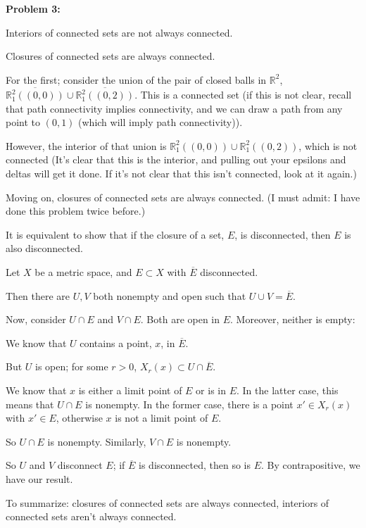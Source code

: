 \documentclass[a4paper,12pt]{article}
\newcommand{\tab}{\hspace{4mm}} %
\newcommand{\shunt}{\vspace{20mm}}
\newcommand{\R}{\mathbb{R}}
\begin{document}
\shunt

{\bf Problem 3:}

Interiors of connected sets are not always connected.

Closures of connected sets are always connected. 

For the first; consider the union of the pair of closed balls in $\R^2$, $\overline{\R^2_1((0,0))} \cup \overline{\R^2_1((0,2))}$. This is a connected set (if this is not clear, recall that path connectivity implies connectivity, and we can draw a path from any point to $(0,1)$ (which will imply path connectivity)).

However, the interior of that union is $\R^2_1((0,0)) \cup \R^2_1((0,2))$, which is not connected (It's clear that this is the interior, and pulling out your epsilons and deltas will get it done. If it's not clear that this isn't connected, look at it again.)

Moving on, closures of connected sets are always connected. (I must admit: I have done this problem twice before.)

\tab It is equivalent to show that if the closure of a set, $E$, is disconnected, then $E$ is also disconnected.

\tab Let $X$ be a metric space, and $E \subset X$ with $\overline{E}$ disconnected.

\tab  Then there are $U,V$ both nonempty and open such that $U \cup V = \overline{E}$.

\tab Now, consider $U \cap E$ and $V \cap E$. Both are open in $E$. Moreover, neither is empty:

\tab \tab We know that $U$ contains a point, $x$, in $\overline{E}$.

\tab \tab But $U$ is open; for some $r >0$, $X_r(x) \subset U \cap \overline{E}$.

\tab \tab We know that $x$ is either a limit point of $E$ or is in $E$. In the latter case, this means that $U \cap E$ is nonempty. In the former case, there is a point $x' \in X_r(x)$ with $x' \in E$, otherwise $x$ is not a limit point of $E$. 

\tab \tab So $U \cap E$ is nonempty. Similarly, $V \cap E$ is nonempty.

\tab \tab So $U$ and $V$ disconnect $E$; if $\overline{E}$ is disconnected, then so is $E$. By contrapositive, we have our result.

To summarize: closures of connected sets are always connected, interiors of connected sets aren't always connected.
\end{document}

